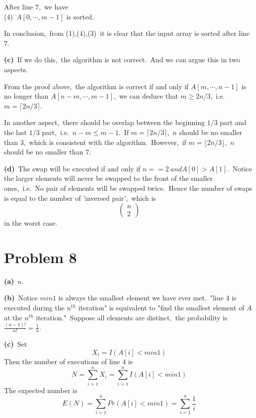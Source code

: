 \documentclass[]{article}
\begin{document}
	After line $7$,\ we have\\ 
	(4)\ $A[0,\cdots,m-1]$ is sorted.
	
	In conclusion,\ from (1),(4),(3)\ it is clear that the input array is sorted after line $7$.
	
	\textbf{(c)}\ If we do this,\ the algorithm is not correct.\ And we can argue this in two aspects.
	
	From the proof above,\ the algorithm is correct if and only if $A[m,\cdots,n-1]$ is no longer than $A[n-m,\cdots,m-1]$,\ we can deduce that $m\geq 2n/3$,\ i.e.\ $m = \lceil 2n/3\rceil$.
	
	In another aspect,\ there should be overlap between the beginning $1/3$ part and the last $1/3$ part,\ i.e.\ $n - m\leq m-1$.\ If $m = \lceil 2n/3\rceil$,\ $n$ should be no smaller than $3$,\ which is consistent with the algorithm.\ However,\ if $m = \lfloor 2n/3\rfloor$,\ $n$ should be no smaller than $7$. 
	
	\textbf{(d)}\ The swap will be executed if and only if $n==2\ and A[0]>A[1]$.\ Notice the larger elements will never be swapped to the front of the smaller ones,\ i.e.\ No pair of elements will be swapped twice.\ Hence the number of swaps is equal to the number of 'inversed pair',\ which is \[\begin{pmatrix} n\\2\end{pmatrix}\] in the worst case. 
	
	\section{Problem 8}
	\textbf{(a)}\ $n$.
	
	\textbf{(b)}\ Notice $min1$ is always the smallest element we have ever met.\ "line 4 is executed during the $n^{th}$ iteration" is equivalent to "find the smallest element of $A$ at the $n^{th}$ iteration."\ Suppose all elements are distinct,\ the probability is $\frac{(n-1)!}{n!} = \frac{1}{n}$.
	
	\textbf{(c)}\ Set
	\begin{equation*}
	X_i = I(A[i] < min1)
	\end{equation*}
	Then the number of executions of line $4$ is 
	\begin{equation*}
	N = \sum_{i=1}^{n}X_i = \sum_{i=1}^{n}I(A[i] < min1)
	\end{equation*}
	The expected number is
	\begin{equation*}
	E(N) = \sum_{i=1}^{n}Pr(A[i] < min1) = \sum_{i=1}^{n}\frac{1}{i}
	\end{equation*}
	
\end{document}
